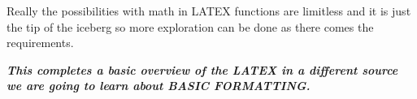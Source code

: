 \documentclass[12pt, letterpaper]{article}
\begin{document}
Really the possibilities with math in LATEX functions are limitless and it is just the tip of the iceberg so more exploration can be done as there comes the requirements.

\textbf{\emph{This completes a basic overview of the LATEX in a different source we are going to learn about BASIC FORMATTING. } }
\end{document}
